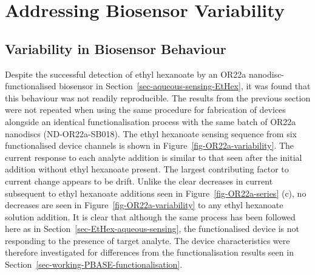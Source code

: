 \documentclass[
  a4paper,
]{scrbook}
\begin{document}
\hypertarget{sec-variability}{%
\section{Addressing Biosensor Variability}\label{sec-variability}}

\hypertarget{sec-variability-biosensor}{%
\subsection{Variability in Biosensor
Behaviour}\label{sec-variability-biosensor}}

Despite the successful detection of ethyl hexanoate by an OR22a
nanodisc-functionalised biosensor in
Section~\ref{sec-aqueous-sensing-EtHex}, it was found that this
behaviour was not readily reproducible. The results from the previous
section were not repeated when using the same procedure for fabrication
of devices alongside an identical functionalisation process with the
same batch of OR22a nanodiscs (ND-OR22a-SB018). The ethyl hexanoate
sensing sequence from six functionalised device channels is shown in
Figure~\ref{fig-OR22a-variability}. The current response to each analyte
addition is similar to that seen after the initial addition without
ethyl hexanoate present. The largest contributing factor to current
change appears to be drift. Unlike the clear decreases in current
subsequent to ethyl hexanoate additions seen in
Figure~\ref{fig-OR22a-series} (c), no decreases are seen in
Figure~\ref{fig-OR22a-variability} to any ethyl hexanoate solution
addition. It is clear that although the same process has been followed
here as in Section~\ref{sec-EtHex-aqueous-sensing}, the functionalised
device is not responding to the presence of target analyte. The device
characteristics were therefore investigated for differences from the
functionalisation results seen in
Section~\ref{sec-working-PBASE-functionalisation}.
\end{document}
